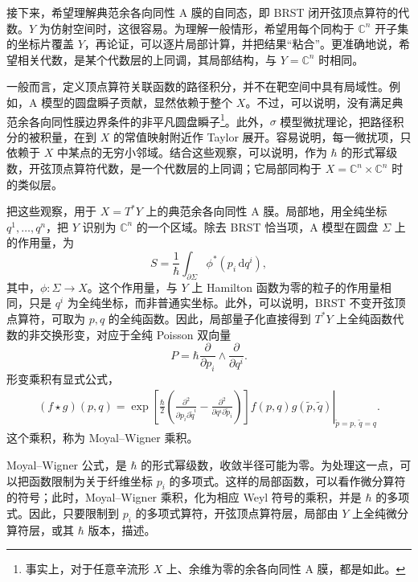 接下来，希望理解典范余各向同性 A 膜的自同态，即 BRST 闭开弦顶点算符的代数。$Y$ 为仿射空间时，这很容易。为理解一般情形，希望用每个同构于 $\mathbb{C}^n$ 开子集的坐标片覆盖 $Y$，再论证，可以逐片局部计算，并把结果“粘合”。更准确地说，希望相关代数，是某个代数层的上同调，其局部结构，与 $Y=\mathbb{C}^n$ 时相同。

一般而言，定义顶点算符关联函数的路径积分，并不在靶空间中具有局域性。例如，A 模型的圆盘瞬子贡献，显然依赖于整个 $X$。不过，可以说明，没有满足典范余各向同性膜边界条件的非平凡圆盘瞬子\footnote{事实上，对于任意辛流形 $X$ 上、余维为零的余各向同性 A 膜，都是如此。}。此外，$\sigma$ 模型微扰理论，把路径积分的被积量，在到 $X$ 的常值映射附近作 Taylor 展开。容易说明，每一微扰项，只依赖于 $X$ 中某点的无穷小邻域。结合这些观察，可以说明，作为 $\hbar$ 的形式幂级数，开弦顶点算符代数，是一个代数层的上同调；它局部同构于 $X=\mathbb{C}^n\times\mathbb{C}^n$ 时的类似层。

把这些观察，用于 $X=T^*Y$ 上的典范余各向同性 A 膜。局部地，用全纯坐标 $q^1,\ldots,q^n$，把 $Y$ 识别为 $\mathbb{C}^n$ 的一个区域。除去 BRST 恰当项，A 模型在圆盘 $\Sigma$ 上的作用量，为
\[
S=\frac1\hbar\int_{\partial\Sigma}\phi^*(p_i\,\mathrm{d}q^i),
\]
其中，$\phi\colon\Sigma\to X$。这个作用量，与 $Y$ 上 Hamilton 函数为零的粒子的作用量相同，只是 $q^i$ 为全纯坐标，而非普通实坐标。此外，可以说明，BRST 不变开弦顶点算符，可取为 $p,q$ 的全纯函数。因此，局部量子化直接得到 $T^*Y$ 上全纯函数代数的非交换形变，对应于全纯 Poisson 双向量
\[
P=\hbar\frac{\partial}{\partial p_i}\wedge\frac{\partial}{\partial q^i}.
\]
形变乘积有显式公式，
\[
\begin{aligned}
(f\star g)(p,q)
=\left.\exp\!\left[\frac\hbar2\left(
\frac{\partial^2}{\partial p_i\partial\tilde q^i}
-\frac{\partial^2}{\partial q^i\partial\tilde p_i}\right)\right]
 f(p,q)g(\tilde p,\tilde q)\right|_{\tilde p=p,\,\tilde q=q}.
\end{aligned}
\]
这个乘积，称为 Moyal--Wigner 乘积。

Moyal--Wigner 公式，是 $\hbar$ 的形式幂级数，收敛半径可能为零。为处理这一点，可以把函数限制为关于纤维坐标 $p_i$ 的多项式。这样的局部函数，可以看作微分算符的符号；此时，Moyal--Wigner 乘积，化为相应 Weyl 符号的乘积，并是 $\hbar$ 的多项式。因此，只要限制到 $p_i$ 的多项式算符，开弦顶点算符层，局部由 $Y$ 上全纯微分算符层，或其 $\hbar$ 版本，描述。

